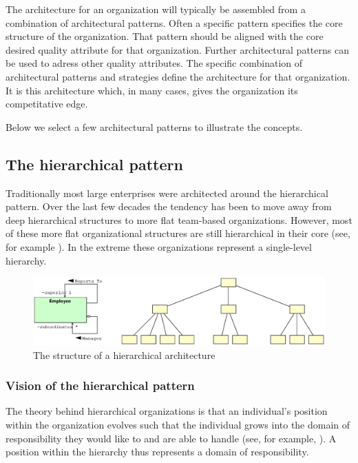 \documentclass[11pt,english,a4]{article}
\begin{document}
The architecture for an organization will typically be assembled from a combination of architectural patterns. Often a specific pattern specifies the core structure of the organization. That pattern should be aligned with the core desired quality attribute for that organization. Further architectural patterns can be used to adress other quality attributes. The specific combination of architectural patterns and strategies define the architecture for that organization. It is this architecture which, in many cases, gives the organization its competitative edge.

Below we select a few architectural patterns to illustrate the concepts.

\subsection{The hierarchical pattern}

Traditionally most large enterprises were architected around the hierarchical pattern. Over the last few decades the tendency has been to move away from deep hierarchical structures to more flat team-based organizations. However, most of these more flat organizational structures are still hierarchical in their core (see, for example \cite{Leavitt-2004}). In the extreme these organizations represent a single-level hierarchy.

\begin{figure}[hbt]
  \begin{center}
    \includegraphics[scale=0.4]{hierarchicalStructure}
    \caption{The structure of a hierarchical architecture}\label{hierarchicalStructure_fig}
  \end{center}
\end{figure}

\subsubsection{Vision of the hierarchical pattern}

The theory behind hierarchical organizations is that an individual's position within the organization evolves such that the individual grows into the domain of responsibility they would like to and are able to handle (see, for example, \cite{Harris-Raviv-2002}). A position within the hierarchy thus represents a domain of responsibility.
\end{document}

